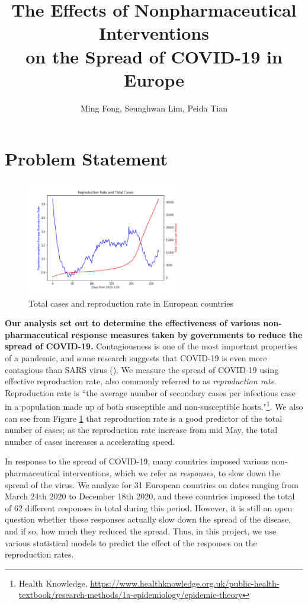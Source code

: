 \documentclass[11pt]{article}
\title{The Effects of Nonpharmaceutical Interventions\\ on the Spread of COVID-19 in Europe}
\author{Ming Fong, Seunghwan Lim, Peida Tian}
\begin{document}
\maketitle

\section{Problem Statement}
\begin{figure}[!hbt]
\centering
    \includegraphics[width=0.6\textwidth]{reproduction_rate_and_total_cases.png}
    \caption{Total cases and reproduction rate in European countries}
    \label{fig:uk_ts_total_reproduction}
\end{figure}
\textbf{Our analysis set out to determine the effectiveness of various non-pharmaceutical response measures taken by governments to reduce the spread of COVID-19.} Contagiousness is one of the most important properties of a pandemic, and some research suggests that COVID-19 is even more contagious than SARS virus (\cite{liu2020}). We measure the spread of COVID-19 using effective reproduction rate, also commonly referred to as \textit{reproduction rate}.  Reproduction rate is ``the average number of secondary cases per infectious case in a population made up of both susceptible and non-susceptible hosts."\footnote{Health Knowledge, \url{https://www.healthknowledge.org.uk/public-health-textbook/research-methods/1a-epidemiology/epidemic-theory}}.  We also can see from Figure \ref{fig:uk_ts_total_reproduction} that reproduction rate is a good predictor of the total number of cases; as the reproduction rate increase from mid May, the total number of cases increases a accelerating speed. 

In response to the spread of COVID-19, many countries imposed various non-pharmaceutical interventions, which we refer as \textit{responses}, to slow down the spread of the virus. We analyze for 31 European countries on dates ranging from March 24th 2020 to December 18th 2020, and these countries imposed the total of 62 different responses in total during this period. However, it is still an open question whether these responses actually slow down the spread of the disease, and if so, how much they reduced the spread. Thus, in this project, we use various statistical models to predict the effect of the responses on the reproduction rates.
\end{document}
